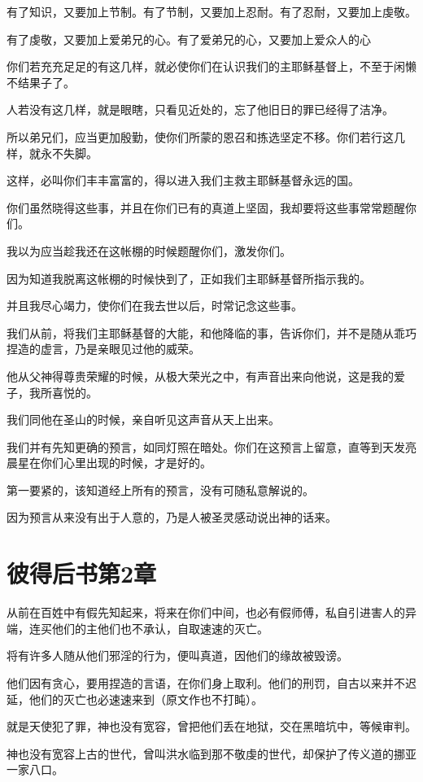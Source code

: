 \documentclass[12pt,oneside]{book}
\begin{document}
有了知识，又要加上节制。有了节制，又要加上忍耐。有了忍耐，又要加上虔敬。

有了虔敬，又要加上爱弟兄的心。有了爱弟兄的心，又要加上爱众人的心

你们若充充足足的有这几样，就必使你们在认识我们的主耶稣基督上，不至于闲懒不结果子了。

人若没有这几样，就是眼瞎，只看见近处的，忘了他旧日的罪已经得了洁净。

所以弟兄们，应当更加殷勤，使你们所蒙的恩召和拣选坚定不移。你们若行这几样，就永不失脚。

这样，必叫你们丰丰富富的，得以进入我们主救主耶稣基督永远的国。

你们虽然晓得这些事，并且在你们已有的真道上坚固，我却要将这些事常常题醒你们。

我以为应当趁我还在这帐棚的时候题醒你们，激发你们。

因为知道我脱离这帐棚的时候快到了，正如我们主耶稣基督所指示我的。

并且我尽心竭力，使你们在我去世以后，时常记念这些事。

我们从前，将我们主耶稣基督的大能，和他降临的事，告诉你们，并不是随从乖巧捏造的虚言，乃是亲眼见过他的威荣。

他从父神得尊贵荣耀的时候，从极大荣光之中，有声音出来向他说，这是我的爱子，我所喜悦的。

我们同他在圣山的时候，亲自听见这声音从天上出来。

我们并有先知更确的预言，如同灯照在暗处。你们在这预言上留意，直等到天发亮晨星在你们心里出现的时候，才是好的。

第一要紧的，该知道经上所有的预言，没有可随私意解说的。

因为预言从来没有出于人意的，乃是人被圣灵感动说出神的话来。

\chapter{彼得后书第2章}
从前在百姓中有假先知起来，将来在你们中间，也必有假师傅，私自引进害人的异端，连买他们的主他们也不承认，自取速速的灭亡。

将有许多人随从他们邪淫的行为，便叫真道，因他们的缘故被毁谤。

他们因有贪心，要用捏造的言语，在你们身上取利。他们的刑罚，自古以来并不迟延，他们的灭亡也必速速来到（原文作也不打盹）。

就是天使犯了罪，神也没有宽容，曾把他们丢在地狱，交在黑暗坑中，等候审判。

神也没有宽容上古的世代，曾叫洪水临到那不敬虔的世代，却保护了传义道的挪亚一家八口。
\end{document}
